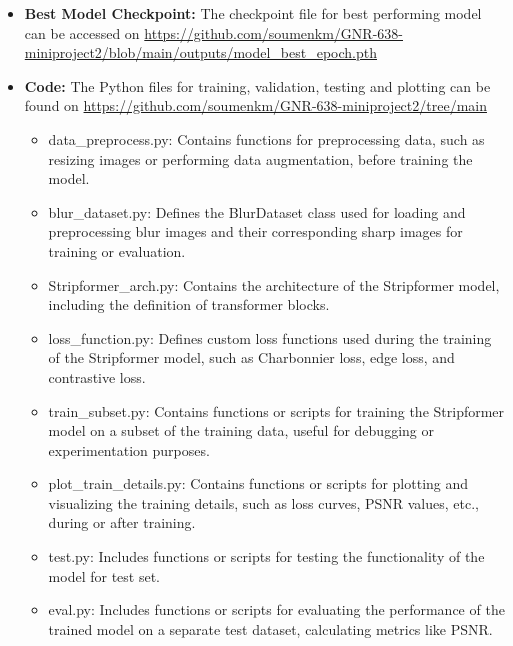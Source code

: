 \documentclass[12pt, a4paper, twoside]{article}
\begin{document}
			\begin{itemize}
				\item \textbf{Best Model Checkpoint:} The checkpoint file for best performing model can be accessed on \url{https://github.com/soumenkm/GNR-638-miniproject2/blob/main/outputs/model_best_epoch.pth}
				
				\item \textbf{Code:} The Python files for training, validation, testing and plotting can be found on \url{https://github.com/soumenkm/GNR-638-miniproject2/tree/main}
				
				\begin{itemize}
					\item data\_preprocess.py: Contains functions for preprocessing data, such as resizing images or performing data augmentation, before training the model.
					
					\item blur\_dataset.py:
					Defines the BlurDataset class used for loading and preprocessing blur images and their corresponding sharp images for training or evaluation.
					
					\item Stripformer\_arch.py:
					Contains the architecture of the Stripformer model, including the definition of transformer blocks.
					
					\item loss\_function.py: Defines custom loss functions used during the training of the Stripformer model, such as Charbonnier loss, edge loss, and contrastive loss.
					
					\item train\_subset.py: Contains functions or scripts for training the Stripformer model on a subset of the training data, useful for debugging or experimentation purposes.
					
					\item plot\_train\_details.py: Contains functions or scripts for plotting and visualizing the training details, such as loss curves, PSNR values, etc., during or after training.			
					
					\item test.py: Includes functions or scripts for testing the functionality of the model for test set.
					
					\item eval.py: Includes functions or scripts for evaluating the performance of the trained model on a separate test dataset, calculating metrics like PSNR.
					
				\end{itemize}

			\end{itemize}
\end{document}
